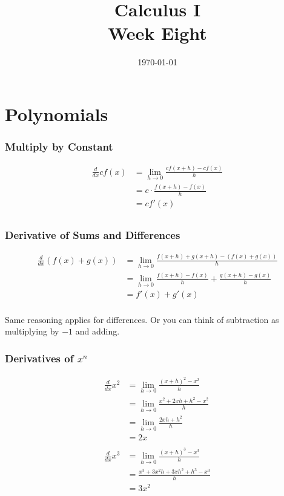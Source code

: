 \documentclass[letterpaper, landscape]{exam}
\author{}
\date{\today}
\title{Calculus I \\ Week Eight}
\begin{document}
  \maketitle
  \tableofcontents

  \part{Polynomials} %
  
  \section{Multiply by Constant} %
  \begin{align*}
    \frac{d}{dx} c f(x) & = \lim_{h \to 0} \frac{c f(x + h) - cf(x)}{h} \\
                        & = c \cdot \frac{f(x + h) - f(x)}{h} \\
                        & = c f'(x) \\
  \end{align*}

  \section{Derivative of Sums and Differences} %
  
  \begin{align*}
    \frac{d}{dx} (f(x) + g(x)) & = \lim_{h \to 0} \frac{f(x + h) + g(x + h) - (f(x) + g(x)) }{h} \\
                               & = \lim_{h \to 0} \frac{f(x + h) - f(x)}{h} + \frac{g(x + h) - g(x)}{h} \\
                               & = f'(x) + g'(x) \\
  \end{align*}

  Same reasoning applies for differences. Or you can think of subtraction as multiplying by $-1$ and adding.

  \section{Derivatives of $x^n$}

  \begin{align*}
    \frac{d}{dx} x^2 & = \lim_{h \to 0} \frac{(x + h)^2 - x^2}{h} \\
                     & = \lim_{h \to 0} \frac{x^2 + 2xh + h^2 - x^2}{h} \\
                     & = \lim_{h \to 0} \frac{2xh + h^2}{h} \\
                     & = 2x \\
    \\
    \frac{d}{dx} x^3 & = \lim_{h \to 0} \frac{(x + h)^3 - x^3}{h} \\
                     & = \frac{x^3 + 3x^2h + 3xh^2 + h^3 - x^3}{h} \\
                     & = 3x^2 \\
  \end{align*}
\end{document}
